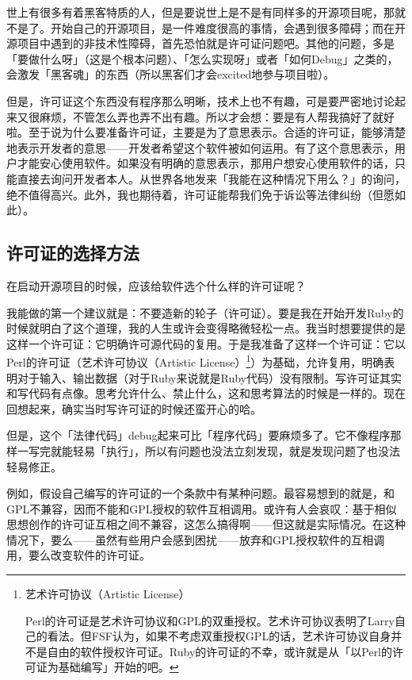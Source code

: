 \documentclass[a4paper,12pt]{article}
\begin{document}
世上有很多有着黑客特质的人，但是要说世上是不是有同样多的开源项目呢，那就不是了。开始自己的开源项目，是一件难度很高的事情，会遇到很多障碍；而在开源项目中遇到的非技术性障碍，首先恐怕就是许可证问题吧。其他的问题，多是「要做什么呀」（这是个根本问题）、「怎么实现呀」或者「如何Debug」之类的，会激发「黑客魂」的东西（所以黑客们才会excited地参与项目啦）。

但是，许可证这个东西没有程序那么明晰，技术上也不有趣，可是要严密地讨论起来又很麻烦，不管怎么弄也弄不出有趣。所以才会想：要是有人帮我搞好了就好啦。至于说为什么要准备许可证，主要是为了意思表示。合适的许可证，能够清楚地表示开发者的意思——开发者希望这个软件被如何运用。有了这个意思表示，用户才能安心使用软件。如果没有明确的意思表示，那用户想安心使用软件的话，只能直接去询问开发者本人。从世界各地发来「我能在这种情况下用么？」的询问，绝不值得高兴。此外，我也期待着，许可证能帮我们免于诉讼等法律纠纷（但愿如此）。

\subsection{许可证的选择方法}

在启动开源项目的时候，应该给软件选个什么样的许可证呢？

我能做的第一个建议就是：不要造新的轮子（许可证）。要是我在开始开发Ruby的时候就明白了这个道理，我的人生或许会变得略微轻松一点。我当时想要提供的是这样一个许可证：它明确许可源代码的复用。于是我准备了这样一个许可证：它以Perl的许可证（艺术许可协议（Artistic License）\footnote{艺术许可协议（Artistic License）

Perl的许可证是艺术许可协议和GPL的双重授权。艺术许可协议表明了Larry自己的看法。但FSF认为，如果不考虑双重授权GPL的话，艺术许可协议自身并不是自由的软件授权许可证。Ruby的许可证的不幸，或许就是从「以Perl的许可证为基础编写」开始的吧。}）为基础，允许复用，明确表明对于输入、输出数据（对于Ruby来说就是Ruby代码）没有限制。写许可证其实和写代码有点像。思考允许什么、禁止什么，这和思考算法的时候是一样的。现在回想起来，确实当时写许可证的时候还蛮开心的哈。

但是，这个「法律代码」debug起来可比「程序代码」要麻烦多了。它不像程序那样一写完就能轻易「执行」，所以有问题也没法立刻发现，就是发现问题了也没法轻易修正。

例如，假设自己编写的许可证的一个条款中有某种问题。最容易想到的就是，和GPL不兼容，因而不能和GPL授权的软件互相调用。或许有人会哀叹：基于相似思想创作的许可证互相之间不兼容，这怎么搞得啊——但这就是实际情况。在这种情况下，要么——虽然有些用户会感到困扰——放弃和GPL授权软件的互相调用，要么改变软件的许可证。
\end{document}
